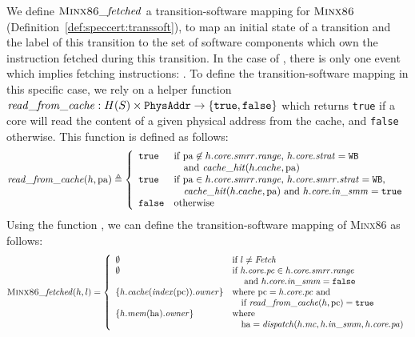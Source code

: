 We define \(\textsc{Minx86}\mathit{\_fetched}\) a transition-software mapping for
$\textsc{Minx86}$ (Definition~\ref{def:speccert:transsoft}), to map an
initial state of a transition and the label of this transition to the set of
software components which own the instruction fetched during this transition.
%
In the case of , there is only one event which implies
fetching instructions: .
%
To define the transition-software mapping in this specific case, we rely on a
helper function
\( \mathit{read\_from\_cache} : H(S) \times \texttt{PhysAddr} \rightarrow \{
\texttt{true}, \texttt{false} \} \) which returns \texttt{true} if a core will
read the content of a given physical address from the cache, and \texttt{false}
otherwise.
%
This function is defined as follows:
%
\[
  \mathit{read\_from\_cache}(h, \mathrm{pa}) \triangleq \left\{
    \begin{array}{ll}
      \texttt{true} & \text{if }\mathrm{pa} \not\in
                      h.\mathit{core}.\mathit{smrr}.\mathit{range}\text{, }
                      h.\mathit{core}.\mathit{strat} = \texttt{WB} \\
                    & \quad\text{and } \mathit{cache\_hit}(h.cache, \mathrm{pa}) \\
      \texttt{true} & \text{if }\mathrm{pa} \in
                      h.\mathit{core}.\mathit{smrr}.\mathit{range}\text{, }
                      h.\mathit{core}.\mathit{smrr}.\mathit{strat} = \texttt{WB}, \\
                    & \quad \mathit{cache\_hit}(h.cache, \mathrm{pa}) \text{ and } h.\mathit{core}.\mathit{in\_smm} =
                      \texttt{true} \\
      \texttt{false} & \text{otherwise}
    \end{array}
  \right.
\]
%
Using the function , we can define the
transition-software mapping of {\scshape Minx86} as follows:
%
\[
  \textsc{Minx86}\mathit{\_fetched}(h, l) = \left\{
    \begin{array}{ll}
      \emptyset & \text{if } l \neq \mathit{Fetch} \\
      \emptyset & \text{if } h.\mathit{core}.\mathit{pc} \in
                  h.\mathit{core}.\mathit{smrr}.\mathit{range} \\
                & \quad \text{ and }
                  h.\mathit{core}.\mathit{in\_smm} = \texttt{false} \\
      \{ h.\mathit{cache}(\mathit{index}(\mathrm{pc})).\mathit{owner} \} & \text{where }
                                                                  \mathrm{pc} =
                                                                  h.\mathit{core}.\mathit{pc}
                                                                  \text{ and} \\
                & \quad\text{if }\mathit{read\_from\_cache}(h, \mathrm{pc})
                  = \texttt{true} \\
      \{ h.\mathit{mem}(\mathrm{ha}).\mathit{owner} \} & \text{where } \\
                & \quad\mathrm{ha} =
                  \mathit{dispatch}(h.\mathit{mc},
                  h.\mathit{in\_smm}, h.\mathit{core}.\mathit{pa})

    \end{array}
  \right.
\]
